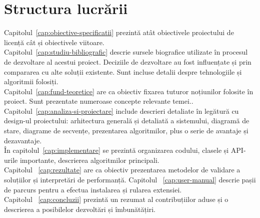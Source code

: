 \section{Structura lucrării}
Capitolul~\ref{cap:obiective-specificatii} prezintă atât obiectivele proiectului de licență cât și obiectivele viitoare.\\
Capitolul~\ref{cap:studiu-bibliografic} descrie sursele biografice utilizate în procesul de dezvoltare al acestui proiect. Deciziile de dezvoltare au fost influențate și prin compararea cu alte soluții existente. Sunt incluse detalii despre tehnologiile și algoritmii folosiți.\\
Capitolul~\ref{cap:fund-teoretice} are ca obiectiv fixarea tuturor noțiunilor folosite în proiect. Sunt prezentate numeroase concepte relevante temei..\\
Capitolul~\ref{cap:analiza-si-proiectare} include descrieri detaliate în legătură cu design-ul proiectului: arhitectura generală și detaliată a sistemului, diagramă de stare, diagrame de secvențe, prezentarea algoritmilor, plus o serie de avantaje și dezavantaje.\\
În capitolul~\ref{cap:implementare} se prezintă organizarea codului, clasele și API-urile importante, descrierea algoritmilor principali.\\
Capitolul ~\ref{cap:rezultate} are ca obiectiv prezentarea metodelor de validare a soluțiilor și interpretări de performanță.
Capitolul ~\ref{cap:user-manual} descrie pașii de parcurs pentru a efectua instalarea și rularea extensiei.\\
Capitolul ~\ref{cap:concluzii} prezintă un rezumat al contribuțiilor aduse și o descrierea a posibilelor dezvoltări și îmbunătățiri.
